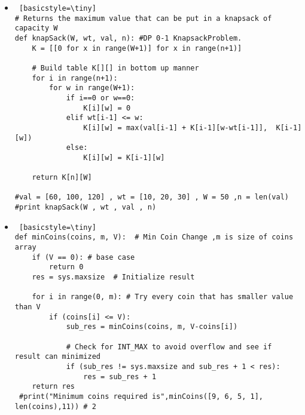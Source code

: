 \documentclass[0.5pt]{report}
\begin{document}
\begin{itemize}
\item
 \begin{lstlisting} [basicstyle=\tiny]
# Returns the maximum value that can be put in a knapsack of capacity W
def knapSack(W, wt, val, n): #DP 0-1 KnapsackProblem.
    K = [[0 for x in range(W+1)] for x in range(n+1)]
 
    # Build table K[][] in bottom up manner
    for i in range(n+1):
        for w in range(W+1):
            if i==0 or w==0:
                K[i][w] = 0
            elif wt[i-1] <= w:
                K[i][w] = max(val[i-1] + K[i-1][w-wt[i-1]],  K[i-1][w])
            else:
                K[i][w] = K[i-1][w]
 
    return K[n][W]
    
#val = [60, 100, 120] , wt = [10, 20, 30] , W = 50 ,n = len(val)
#print knapSack(W , wt , val , n)
 \end{lstlisting}
 
 \item
 
  \begin{lstlisting} [basicstyle=\tiny]
def minCoins(coins, m, V):  # Min Coin Change ,m is size of coins array 
    if (V == 0): # base case
        return 0
    res = sys.maxsize  # Initialize result
    
    for i in range(0, m): # Try every coin that has smaller value than V
        if (coins[i] <= V):
            sub_res = minCoins(coins, m, V-coins[i])
 
            # Check for INT_MAX to avoid overflow and see if  result can minimized
            if (sub_res != sys.maxsize and sub_res + 1 < res):
                res = sub_res + 1
    return res
 #print("Minimum coins required is",minCoins([9, 6, 5, 1], len(coins),11)) # 2
 \end{lstlisting}

 \end{itemize}
 
\end{document}
